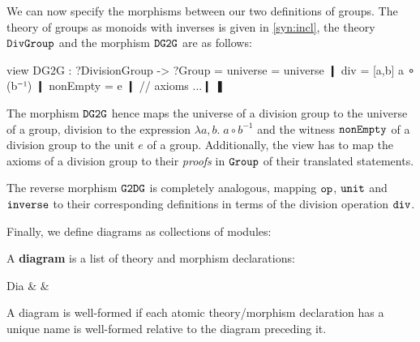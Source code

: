 \begin{example}
	We can now specify the morphisms between our two definitions of groups. The theory of groups as monoids with inverses is given in \autoref{syn:incl}, the theory $\operatorname{\mathtt{DivGroup}}$ and the morphism $\operatorname{\mathtt{DG2G}}$ are as follows:
\begin{mmtcode}
view DG2G : ?DivisionGroup -> ?Group =
  universe = universe ❙
  div = [a,b] a ∘ (b⁻¹) ❙
  nonEmpty = e ❙
  // axioms ...❙
❚
\end{mmtcode}
The morphism $\operatorname{\mathtt{DG2G}}$ hence maps the universe of a division group to the universe of a group, division to the expression $\lambda a,b.\; a\circ b^{-1}$ and the witness $\operatorname{\mathtt{nonEmpty}}$ of a division group to the unit $e$ of a group. Additionally, the view has to map the axioms of a division group to their \emph{proofs} in $\operatorname{\mathtt{Group}}$ of their translated statements.

The reverse morphism $\operatorname{\mathtt{G2DG}}$ is completely analogous, mapping $\operatorname{\mathtt{op}}$, $\operatorname{\mathtt{unit}}$ and $\operatorname{\mathtt{inverse}}$ to their corresponding definitions in terms of the division operation $\operatorname{\mathtt{div}}$.
\end{example}


Finally, we define diagrams as collections of modules:

\begin{definition}[Diagram]
A \textbf{diagram} is a list of theory and morphism declarations:
\begin{grammar}
Dia    &           & \\
\end{grammar}
A diagram is well-formed if each atomic theory/morphism declaration has a unique name is well-formed relative to the diagram preceding it.
\end{definition}

